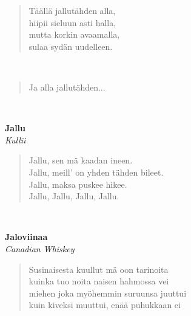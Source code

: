 \noindent\begin{minipage}{\linewidth}
\begin{verse}
	Täällä jallutähden alla,\\
	hiipii sieluun asti halla,\\
	mutta korkin avaamalla,\\
	sulaa sydän uudelleen.\\
\end{verse}
\end{minipage}\\[10pt]
\noindent\begin{minipage}{\linewidth}
\begin{verse}
	Ja alla jallutähden...\\
\end{verse}
\end{minipage}\\[10pt]
%
%
\noindent\begin{minipage}{\linewidth}
\vspace{5pt}
\parbox[t]{0.85\linewidth}{\raggedright {\large\bf Jallu}\\[2pt]\small\emph{Kullii}\\[6pt]}
\begin{verse}
	
	Jallu, sen mä kaadan ineen.\\
	Jallu, meill' on yhden tähden bileet.\\
	Jallu, maksa puskee hikee.\\
	Jallu, Jallu, Jallu, Jallu.\\
\end{verse}
\end{minipage}\\[10pt]
%
%
\noindent\begin{minipage}{\linewidth}
\vspace{5pt}
\parbox[t]{0.85\linewidth}{\raggedright {\large\bf Jaloviinaa}\\[2pt]\small\emph{Canadian Whiskey}\\[6pt]}
\begin{verse}
	
	Susinaisesta kuullut mä oon tarinoita\\
	kuinka tuo noita naisen hahmossa vei\\
	miehen joka myöhemmin suruunsa juuttui\\
	kuin kiveksi muuttui, enää puhukkaan ei\\
\end{verse}
\end{minipage}\\[10pt]
